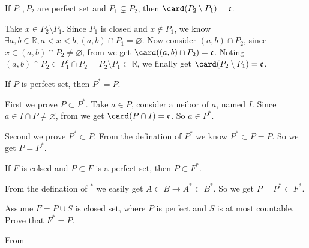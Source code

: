 \documentclass{ctexart}
\begin{document}
\begin{problem}
  If \(P_1,P_2\) are perfect set and \(P_1 \subsetneq P_2\), then \(\card(P_2\setminus P_1)=\mathfrak{c}\). 
\end{problem}

\begin{solution}
Take \(x \in P_2 \setminus P_1\). Since \(P_1\) is closed and \(x \notin P_1\), we know \(\exists a,b \in \mathbb{R},a<x<b,(a,b) \cap P_1 = \varnothing\). 
Now consider \((a,b) \cap P_{2}\), since \(x \in (a,b) \cap P_2 \neq \varnothing\), from  we get \(\card((a,b) \cap P_2)=\mathfrak{c}\). 
Noting \((a,b) \cap P_2 \subset P_1^{c} \cap P_2 = P_2 \setminus P_1 \subset \mathbb{R}\), we finally get \(\card(P_2 \setminus P_1)=\mathfrak{c}\). 
\end{solution}

\begin{problem}
  If \(P\) is perfect set, then \(P^{*}=P\). 
\end{problem}

\begin{solution}
  First we prove \(P \subset P^{*}\). Take \(a \in P\), consider a neibor of \(a\), named \(I\). 
  Since \(a \in I \cap P \neq \varnothing\), from  we get \(\card(P \cap I)=\mathfrak{c}\). 
  So \(a \in P^{*}\). 

  Second we prove \(P^{*} \subset P\). From the defination of \(P^{*}\) we know \(P^{*}\subset \overline{P} = P\). 
  So we get \(P = P^{*}\). 
\end{solution}

\begin{problem}\label{pro:4}
  If \(F\) is colsed and \(P \subset F\) is a perfect set, then \(P \subset F^{*}\). 
\end{problem}

\begin{solution}
  From the defination of \({}^{*}\) we easily get \(A \subset B \to A^{*} \subset B^{*}\). 
  So we get \(P = P^{*} \subset F^{*}\). 
\end{solution}

\begin{problem}
  Assume \(F=P \cup S\) is closed set, where \(P\) is perfect and \(S\) is at most countable. 
  Prove that \(F^{*}=P\). 
\end{problem}

\begin{solution}
  From 
\end{solution}
\end{document}
